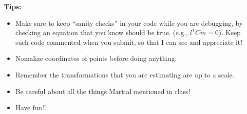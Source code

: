 \documentclass[11pt]{article}
\begin{document}
{\bf Tips:}
\begin{itemize}
\item Make sure to keep ``sanity checks'' in your code while you are debugging, by checking an equation that you know should be true. (e.g., $l^TCm=0$). Keep such code commented when you submit, so that I can see and appreciate it!
\item Nomalize coordinates of points before doing anything.
\item Remember the transformations that you are estimating are up to a scale.
\item Be careful about all the things Martial mentioned in class!
\item Have fun!!
\end{itemize}
\end{document}
